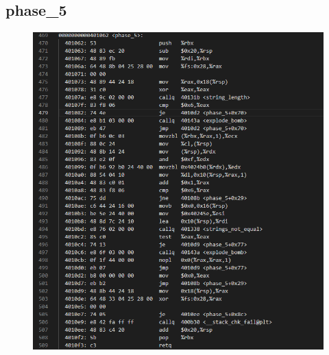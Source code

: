 \documentclass[12pt, a4paper, oneside]{ctexart}
\begin{document}
\subsection{phase\_5}
\begin{figure}[htbp]
    \includegraphics[scale=0.7]{image/2.6-1.png}
\end{figure}
\end{document}
